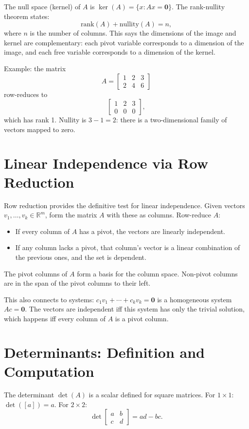 \documentclass[11pt]{article}
\begin{document}
The null space (kernel) of $A$ is $\ker(A) = \{x : Ax = \mathbf{0}\}$. The rank-nullity theorem states:
\[
\text{rank}(A) + \text{nullity}(A) = n,
\]
where $n$ is the number of columns. This says the dimensions of the image and kernel are complementary: each pivot variable corresponds to a dimension of the image, and each free variable corresponds to a dimension of the kernel.

Example: the matrix
\[
A = \begin{bmatrix} 1 & 2 & 3 \\ 2 & 4 & 6 \end{bmatrix}
\]
row-reduces to
\[
\begin{bmatrix} 1 & 2 & 3 \\ 0 & 0 & 0 \end{bmatrix},
\]
which has rank 1. Nullity is $3 - 1 = 2$: there is a two-dimensional family of vectors mapped to zero.

\section*{Linear Independence via Row Reduction}

Row reduction provides the definitive test for linear independence. Given vectors $v_1, \ldots, v_k \in \mathbb{R}^m$, form the matrix $A$ with these as columns. Row-reduce $A$:
\begin{itemize}
  \item If every column of $A$ has a pivot, the vectors are linearly independent.
  \item If any column lacks a pivot, that column's vector is a linear combination of the previous ones, and the set is dependent.
\end{itemize}

The pivot columns of $A$ form a basis for the column space. Non-pivot columns are in the span of the pivot columns to their left.

This also connects to systems: $c_1 v_1 + \cdots + c_k v_k = \mathbf{0}$ is a homogeneous system $Ac = \mathbf{0}$. The vectors are independent iff this system has only the trivial solution, which happens iff every column of $A$ is a pivot column.

\section*{Determinants: Definition and Computation}

The determinant $\det(A)$ is a scalar defined for square matrices. For $1 \times 1$: $\det([a]) = a$. For $2 \times 2$:
\[
\det\begin{bmatrix} a & b \\ c & d \end{bmatrix} = ad - bc.
\]
\end{document}
